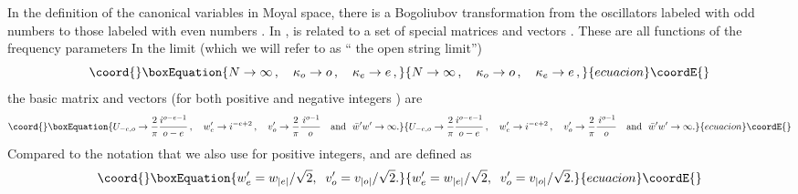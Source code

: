\documentclass[a4paper,aps,preprint,nofootinbib,eqsecnum]{revtex4}
\begin{document}
In the definition of the canonical variables in Moyal space, there is a
Bogoliubov transformation \coordHE{} from the oscillators labeled with odd
numbers \coordHE{} to those labeled with even numbers \coordHE{}. In \cite{BM1, BM2, BKM1}%
, \coordHE{} is related to a set of special matrices and vectors \coordHE{}. These are all functions of the frequency parameters \coordHE{} In the limit (which we will refer to as \textquotedblleft
the open string limit\textquotedblright )
\begin{equation}\coord{}\boxEquation{
N\rightarrow \infty \,,\quad \kappa _{o}\rightarrow o\,,\quad \kappa
_{e}\rightarrow e\,,  \label{open_string_limit}
}{
N\rightarrow \infty \,,\quad \kappa _{o}\rightarrow o\,,\quad \kappa
_{e}\rightarrow e\,,  }{ecuacion}\coordE{}\end{equation}%
the basic matrix \coordHE{} and vectors \coordHE{} (for both
positive and negative integers \coordHE{}) are
\begin{equation}\coord{}\boxEquation{
U_{-e,o}\rightarrow \frac{2}{\pi }\frac{i^{o-e-1}}{o-e}\,,\quad
w_{e}^{\prime }\rightarrow i^{-e+2}\,,\quad v_{o}^{\prime }\rightarrow \frac{
2}{\pi }\frac{\,i^{o-1}}{o}\quad \mbox{and }\ \bar{w}^{\prime }w^{\prime
}\rightarrow \infty .  \label{limit}
}{
U_{-e,o}\rightarrow \frac{2}{\pi }\frac{i^{o-e-1}}{o-e}\,,\quad
w_{e}^{\prime }\rightarrow i^{-e+2}\,,\quad v_{o}^{\prime }\rightarrow \frac{
2}{\pi }\frac{\,i^{o-1}}{o}\quad \mbox{and }\ \bar{w}^{\prime }w^{\prime
}\rightarrow \infty .  }{ecuacion}\coordE{}\end{equation}%
Compared to the notation \coordHE{} that we also use for positive
integers, \coordHE{} and \coordHE{} are defined as
\begin{equation}\coord{}\boxEquation{
w_{e}^{\prime }=w_{|e|}/\sqrt{2},\;\;v_{o}^{\prime }=v_{|o|}/\sqrt{2}.
}{
w_{e}^{\prime }=w_{|e|}/\sqrt{2},\;\;v_{o}^{\prime }=v_{|o|}/\sqrt{2}.
}{ecuacion}\coordE{}\end{equation}
\end{document}
